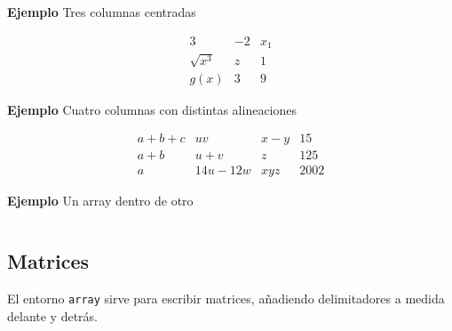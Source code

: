\documentclass[11pt,a4paper]{report}
\begin{document}
\bigskip
\textbf{Ejemplo} Tres columnas centradas

\begin{equation*}
\begin{array}{ccc}
3 & -2 & x_1 \\
\sqrt{x^3} & z & 1 \\
g(x) & 3 & 9
\end{array}
\end{equation*}

\bigskip





\bigskip
\textbf{Ejemplo} Cuatro columnas con distintas alineaciones

\begin{equation*}
\begin{array}{crlc}
a+b+c&uv&x-y&15\\
a+b&u+v&z&125\\
a&14u-12w&xyz&2002
\end{array}
\end{equation*}

\bigskip





\textbf{Ejemplo} Un array dentro de otro

\begin{equation*}
\end{equation*}

\bigskip





\subsection{Matrices}





El entorno \texttt{array} sirve para escribir matrices, añadiendo delimitadores a medida delante y detrás.
\end{document}
